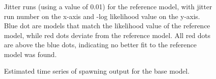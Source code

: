 \documentclass[
]{scrartcl}
\begin{document}
\begin{figure}[H]


\caption{\label{fig-jitter001}Jitter runs (using a value of 0.01) for
the reference model, with jitter run number on the x-axis and -log
likelihood value on the y-axis. Blue dot are models that match the
likelihood value of the reference model, while red dots deviate from the
reference model. All red dots are above the blue dots, indicating no
better fit to the reference model was found.}

\end{figure}%

\begin{figure}[H]


\caption{\label{fig-sb}Estimated time series of spawning output for the
base model.}

\end{figure}%
\end{document}
